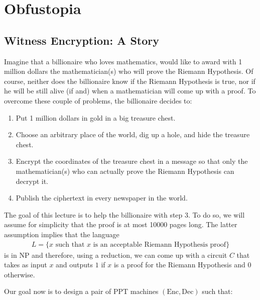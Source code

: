 
\chapter{Obfustopia}


\section{Witness Encryption: A Story}\label{story}

Imagine that a billionaire who loves mathematics, would like to award with 1 million dollars the mathematician(s) who will prove the Riemann Hypothesis. Of course, neither does the billionaire know if the Riemann Hypothesis is true, nor if he will be still alive (if and) when a mathematician will come up with a proof. To overcome these couple of problems, the billionaire decides to:

\begin{enumerate}

\item Put 1 million dollars in gold in a big treasure chest.

\item Choose an arbitrary place of the world, dig up a hole, and hide the treasure chest.

\item Encrypt the coordinates of the treasure chest in a message so that only the mathematician(s) who can actually prove the Riemann Hypothesis can decrypt it.

\item Publish the ciphertext in every newspaper in the world.

\end{enumerate}

The goal of this lecture is to help the billionaire with step 3. To do so, we will assume for simplicity  that the proof is at most 10000 pages long. The latter assumption implies that the language
\begin{align*}
L = \{ x \text{ such that } x \text{ is an acceptable Riemann Hypothesis proof} \}
\end{align*}
 is in NP and therefore, using a reduction, we can come up with a circuit $C$ that takes as input $x$ and outputs $1$ if $x$ is a proof for the Riemann Hypothesis and $0$ otherwise.

\smallskip
Our goal now is to  design a pair of PPT machines $(\mathrm{Enc},\mathrm{Dec})$ such that:

